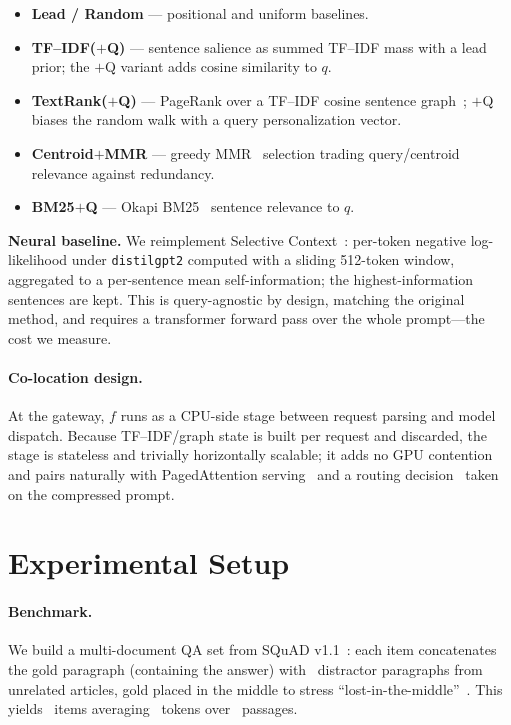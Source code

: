 \documentclass[11pt]{article}
\begin{document}
\begin{itemize}[leftmargin=1.2em,itemsep=1pt,topsep=2pt]
  \item \textbf{Lead / Random} --- positional and uniform baselines.
  \item \textbf{TF--IDF($+$Q)} --- sentence salience as summed TF--IDF mass with a lead
  prior; the $+$Q variant adds cosine similarity to $q$.
  \item \textbf{TextRank($+$Q)} --- PageRank over a TF--IDF cosine sentence
  graph~\cite{textrank}; $+$Q biases the random walk with a query
  personalization vector.
  \item \textbf{Centroid$+$MMR} --- greedy MMR~\cite{mmr} selection trading query/centroid
  relevance against redundancy.
  \item \textbf{BM25$+$Q} --- Okapi BM25~\cite{bm25} sentence relevance to $q$.
\end{itemize}

\noindent\textbf{Neural baseline.} We reimplement Selective
Context~\cite{selectivecontext}: per-token negative log-likelihood under
\texttt{distilgpt2} computed with a sliding 512-token window, aggregated to a
per-sentence mean self-information; the highest-information sentences are kept. This is
query-agnostic by design, matching the original method, and requires a transformer
forward pass over the whole prompt---the cost we measure.

\paragraph{Co-location design.} At the gateway, $f$ runs as a CPU-side stage between
request parsing and model dispatch. Because TF--IDF/graph state is built per request and
discarded, the stage is stateless and trivially horizontally scalable; it adds no GPU
contention and pairs naturally with PagedAttention serving~\cite{vllm} and a routing
decision~\cite{routellm,meshapi} taken on the compressed prompt.

\section{Experimental Setup}\label{sec:setup}
\paragraph{Benchmark.} We build a multi-document QA set from SQuAD
v1.1~\cite{squad}: each item concatenates the gold paragraph (containing the answer)
with \nDistractors\ distractor paragraphs from unrelated articles, gold placed in the
middle to stress ``lost-in-the-middle''~\cite{lostmiddle}. This yields
\nItems\ items averaging \meanSrcTokens\ tokens over \meanPassages\ passages.
\end{document}
